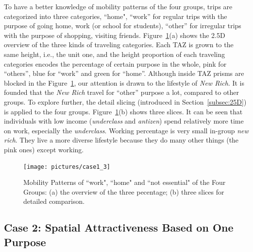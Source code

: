 To have a better knowledge of mobility patterns of the four groups, trips are categorized into three categories, ``home", ``work'' for regular trips with the purpose of going home, work (or school for students), ``other'' for irregular trips with the purpose of shopping, visiting friends. Figure~\ref{case13}(a) shows the 2.5D overview of the three kinds of traveling categories. Each TAZ is grown to the same height, i.e., the unit one, and the height proportion of each traveling categories encodes the percentage of certain purpose in the whole, pink for ``others'', blue for ``work'' and green for ``home''. Although inside TAZ prisms are blocked in the Figure~\ref{case13}, our attention is drawn to the lifestyle of \textit{New Rich}. It is founded that the \textit{New Rich} travel for ``other'' purpose a lot, compared to other groups. To explore further, the detail slicing (introduced in Section~\ref{subsec:25D}) is applied to the four groups. Figure~\ref{case13}(b) shows three slices. It can be seen that individuals with low income (\textit{underclass} and \textit{antizen}) spend relatively more time on work, especially the \textit{underclass}. Working percentage is very small in-group \textit{new rich}. They live a more diverse lifestyle because they do many other things (the pink ones) except working.


\begin{figure}[htb!]
 \centering %
 \texttt{[image: pictures/case1\_3]}
 \caption{Mobility Patterns of ``work", ``home" and ``not essential" of the Four Groups: (a) the overview of the three pecentage; (b) three slices for detailed comparison.}
 \label{case13}
\end{figure}


\subsection{Case 2: Spatial Attractiveness Based on One Purpose}


